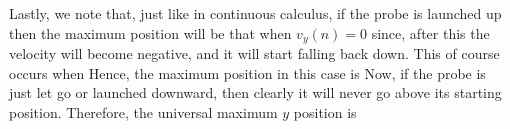 \documentclass{article}
\begin{document}
{    Lastly, we note that, just like in continuous calculus, if the probe is launched up then the maximum position will be that when $v_y(n) = 0$ since, after this the velocity will become negative, and it will start falling back down.
    This of course occurs when
    Hence, the maximum position in this case is
    Now, if the probe is just let go or launched downward, then clearly it will never go above its starting position.
    Therefore, the universal maximum $y$ position is

}
\end{document}
